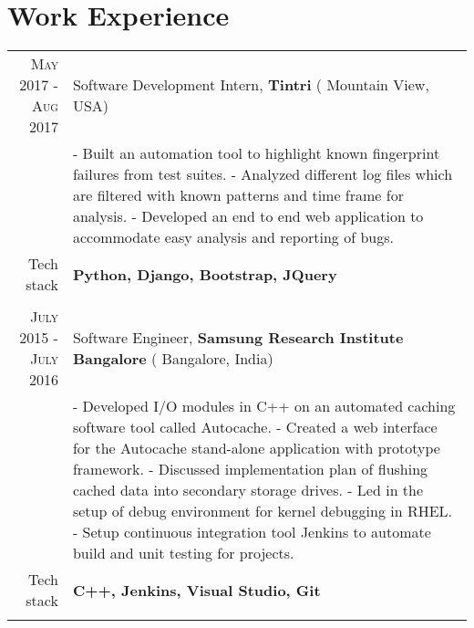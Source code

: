 \section {Work Experience}
\renewcommand{\arraystretch}{0.95}%
\begin{tabular}{r|p{14cm}}
\textsc{May 2017 - Aug 2017} & Software Development Intern, \textbf{Tintri} ( Mountain View, USA)\\
& \small{
- Built an automation tool to highlight known fingerprint failures from test suites. \newline
- Analyzed different log files which are filtered with known patterns and time frame for analysis.\newline
- Developed an end to end web application to accommodate easy analysis and reporting of bugs.} \\
\small{Tech stack} &\footnotesize{\textbf{Python, Django, Bootstrap, JQuery}} \\
\multicolumn{2}{c}{} \\

\textsc{July 2015 - July 2016} & Software Engineer, \textbf{Samsung Research Institute Bangalore} ( Bangalore, India) \\
& \small{
- Developed I/O modules in C++ on an automated caching software tool called Autocache.\newline
- Created a web interface for the Autocache stand-alone application with prototype framework.\newline
- Discussed implementation plan of flushing cached data into secondary storage drives.\newline
- Led in the setup of debug environment for kernel debugging in RHEL. \newline
- Setup continuous integration tool Jenkins to automate build and unit testing for projects.}\\
\small{Tech stack} &\footnotesize{\textbf{C++, Jenkins, Visual Studio, Git}} \\
\multicolumn{2}{c}{} \\




\end{tabular}

